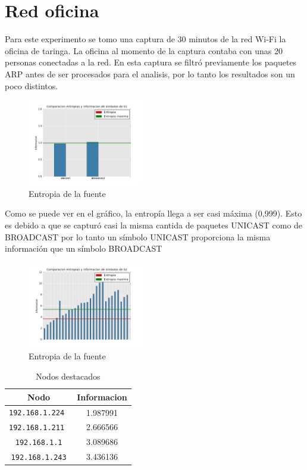 \section{Red oficina}

Para este experimento se tomo una captura de 30 minutos de la red Wi-Fi la oficina de taringa.
La oficina al momento de la captura contaba con unas 20 personas conectadas a la red.
En esta captura se filtró previamente los paquetes ARP antes de ser procesados para el analisis,
por lo tanto los resultados son un poco distintos.

\begin{figure}[h]
  \centering
    \includegraphics[width=0.45\textwidth]{grafico1-red-taringa.png}
  \caption{Entropia de la fuente}
  \label{}
\end{figure}
Como se puede ver en el gráfico, la entropía llega a ser casi máxima (0,999). 
Esto es debido a que se capturó casi la misma cantida de paquetes UNICAST como de BROADCAST
por lo tanto un símbolo UNICAST proporciona la misma información que un símbolo BROADCAST 

\begin{figure}[h]
  \centering
    \includegraphics[width=0.45\textwidth]{grafico2-red-taringa.png}
  \caption{Entropia de la fuente}
  \label{}
\end{figure}

    \begin{table}[ht]\begin{center}
      \begin{tabular}{|c|c|}
      \hline
      \textbf{Nodo} & \textbf{Informacion} \\ \hline
      \texttt{192.168.1.224 }& 1.987991 \\ \hline
      \texttt{192.168.1.211 }& 2.666566 \\ \hline
      \texttt{192.168.1.1}& 3.089686 \\ \hline
      \texttt{192.168.1.243}& 3.436136 \\ \hline
      \end{tabular}
      \caption{Nodos destacados}
      \label{Nodos-destacados}
    \end{center}\end{table}

